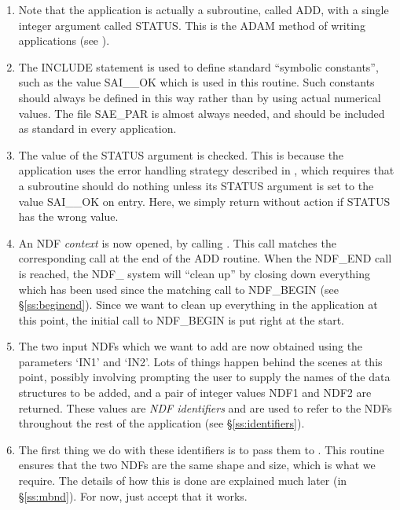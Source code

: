 \documentclass[twoside,11pt,nolof]{starlink}
\providecommand{\st}[1]{{\emph{#1}}}
\begin{document}
\begin{enumerate}

\item Note that the application is actually a subroutine, called ADD,
with a single integer argument called STATUS.  This is the ADAM method
of writing applications (see ).

\item The INCLUDE statement is used to define standard ``symbolic
constants'', such as the value SAI\_\_OK which is used in this
routine.  Such constants should always be defined in this way rather
than by using actual numerical values.  The file SAE\_PAR is almost
always needed, and should be included as standard in every
application.

\item The value of the STATUS argument is checked.  This is because
the application uses the error handling strategy described in
, which requires that a
subroutine should do nothing unless its STATUS argument is set to the
value SAI\_\_OK on entry.  Here, we simply return without action if
STATUS has the wrong value.

\item An NDF \st{context\/} is now opened, by calling .
This call matches the corresponding  call at the end of the ADD
routine.
When the NDF\_END call is reached, the NDF\_ system will ``clean up'' by
closing down everything which has been used since the matching call to
NDF\_BEGIN (see \S\ref{ss:beginend}).
Since we want to clean up everything in the application at this point, the
initial call to NDF\_BEGIN is put right at the start.

\item The two input NDFs which we want to add are now obtained using the
parameters `IN1' and `IN2'.
Lots of things happen behind the scenes at this point, possibly involving
prompting the user to supply the names of the data structures to be added,
and a pair of integer values NDF1 and NDF2 are returned.
These values are \st{NDF identifiers\/} and are used to refer to the NDFs
throughout the rest of the application (see \S\ref{ss:identifiers}).

\item The first thing we do with these identifiers is to pass them to
.
This routine ensures that the two NDFs are the same shape and size, which is
what we require.
The details of how this is done are explained much later (in
\S\ref{ss:mbnd}).
For now, just accept that it works.


\end{enumerate}
\end{document}
